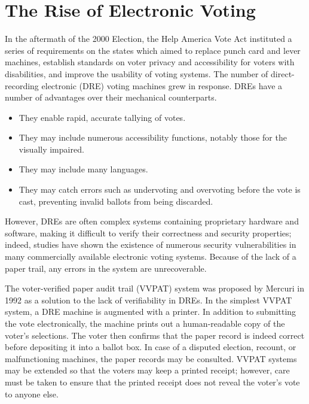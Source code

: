 \section{The Rise of Electronic Voting} \label{intro:evoting}

In the aftermath of the 2000 Election, the Help America Vote Act instituted a series of requirements on the states which aimed to replace punch card and lever machines, establish standards on voter privacy and accessibility for voters with disabilities, and improve the usability of voting systems. The number of direct-recording electronic (DRE) voting machines grew in response. DREs have a number of advantages over their mechanical counterparts.
\begin{itemize}
\item They enable rapid, accurate tallying of votes.
\item They may include numerous accessibility functions, notably those for the visually impaired.
\item They may include many languages.
\item They may catch errors such as undervoting and overvoting before the vote is cast, preventing invalid ballots from being discarded.
\end{itemize}

However, DREs are often complex systems containing proprietary hardware and software, making it difficult to verify their correctness and security properties; indeed, studies \cite{wiki:dre, feldman07, gonggrijp06} have shown the existence of numerous security vulnerabilities in many commercially available electronic voting systems. Because of the lack of a paper trail, any errors in the system are unrecoverable.

The voter-verified paper audit trail (VVPAT) system was proposed by Mercuri \cite{mercuri:vvpat} in 1992 as a solution to the lack of verifiability in DREs. In the simplest VVPAT system, a DRE machine is augmented with a printer. In addition to submitting the vote electronically, the machine prints out a human-readable copy of the voter's selections. The voter then confirms that the paper record is indeed correct before depositing it into a ballot box. In case of a disputed election, recount, or malfunctioning machines, the paper records may be consulted. VVPAT systems may be extended so that the voters may keep a printed receipt; however, care must be taken to ensure that the printed receipt does not reveal the voter's vote to anyone else.

